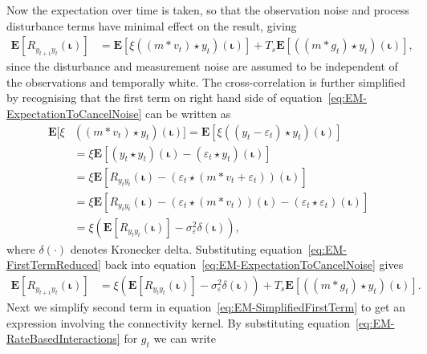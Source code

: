 \documentclass[]{article}
\begin{document}
Now the expectation over time is taken, so that the observation noise and process disturbance terms have minimal effect on the result, giving 
\begin{align}\label{eq:EM-ExpectationToCancelNoise}
	\mathbf{E}[R_{y_{t+1}y_t}(\boldsymbol{\iota})] &= \mathbf{E}[\xi\left(\left(m \ast v_t\right) \star y_t \right)(\boldsymbol{\iota})] + T_s \mathbf{E}[\left(\left(m\ast g_t\right)\star y_t \right)(\boldsymbol{\iota})],
\end{align}
since the disturbance and measurement noise are assumed to be independent of the observations and temporally white. 
The cross-correlation is further simplified by recognising that the first term on right hand side of equation~\eqref{eq:EM-ExpectationToCancelNoise} can be written as 
\begin{align}
	\mathbf{E}[\xi&\left(\left(m \ast v_t \right) \star y_t \right)(\boldsymbol{\iota})] = \mathbf{E}\left[\xi\left(\left(y_t-\varepsilon_t\right) \star y_t \right)(\boldsymbol{\iota})\right] \nonumber \\
	&= \xi \mathbf{E}\left[ (y_t \star y_t)(\boldsymbol{\iota}) - \left(\varepsilon_t\star y_t \right)(\boldsymbol{\iota})\right] \nonumber \\
	&= \xi\mathbf{E}[ R_{y_ty_t}(\boldsymbol{\iota})  - \left(\varepsilon_t \star (m\ast v_t + \varepsilon_t)\right) (\boldsymbol{\iota})] \nonumber \\
	&=\xi\mathbf{E}[ R_{y_ty_t}(\boldsymbol{\iota}) -\left(\varepsilon_t\star (m\ast v_t)\right)(\boldsymbol{\iota}) - (\varepsilon_t\star\varepsilon_t)(\boldsymbol{\iota})] \nonumber \\
	&= \xi\left(\mathbf{E}[ R_{y_ty_t}(\boldsymbol{\iota})] - \sigma_{\varepsilon}^2 \delta(\boldsymbol{\iota})\right), \label{eq:EM-FirstTermReduced}
\end{align}
where $\delta\left(\cdot\right)$ denotes Kronecker delta. Substituting equation~\eqref{eq:EM-FirstTermReduced} back into equation~\eqref{eq:EM-ExpectationToCancelNoise} gives
\begin{align}\label{eq:EM-SimplifiedFirstTerm}
	\mathbf{E}[R_{y_{t+1}y_t}(\boldsymbol{\iota})] &= \xi\left(\mathbf{E}[ R_{y_ty_t}(\boldsymbol{\iota})] - \sigma_{\varepsilon}^2 \delta(\boldsymbol{\iota})\right)+ T_s\mathbf{E}[ \left(\left(m\ast g_t\right)\star y_t \right)(\boldsymbol{\iota})].
\end{align}
Next we simplify second term in equation~\eqref{eq:EM-SimplifiedFirstTerm} to get an expression involving the connectivity kernel. By substituting equation~\eqref{eq:EM-RateBasedInteractions} for $g_t$ we can write
\end{document}
